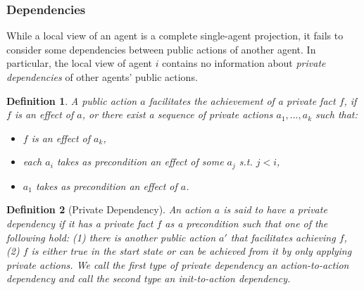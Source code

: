 \documentclass[letterpaper]{article}
\newcommand{\public}{\textit{public}}
\newtheorem{definition}{Definition}
\theoremstyle{definition}
\begin{document}



\subsubsection{Dependencies}

While a local view of an agent is a complete single-agent projection, it fails to consider some dependencies between public actions of another agent. In particular, the local view of agent $i$ contains no information about {\em private dependencies} of other agents' public actions. %


\begin{definition}
A public action $a$ {\em facilitates} the achievement of a private fact $f$, if $f$ is an effect of $a$, or there exist a sequence of private actions $a_1,...,a_k$ such that:
\begin{itemize}
\item $f$ is an effect of $a_k$,
\item each $a_i$ takes as precondition an effect of some $a_j$ s.t. $j<i$,
\item $a_1$ takes as precondition an effect of $a$.
\end{itemize}
\end{definition}

\begin{definition}[Private Dependency]
An action $a$ is said to have a private dependency if it has a private fact $f$ as a precondition such that one of the following hold: (1) there is another public action $a'$ that facilitates achieving $f$,  (2) $f$ is either true in the start state or can be achieved from it by only applying private actions. We call the first type of private dependency an action-to-action dependency and call the second type an init-to-action dependency.
\label{def:private-dependency}
\end{definition}
\end{document}
